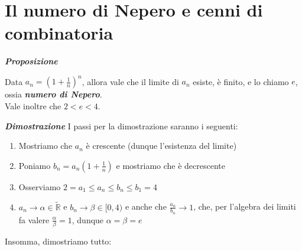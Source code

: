 \documentclass{article}
\theoremstyle{definition}
\newcommand{\R}{\mathbb{R}}
\begin{document}
\section{Il numero di Nepero e cenni di combinatoria}
\begin{center}
    \textbf{\textit{Proposizione}}
\end{center}
Data $a_n=(1+\frac{1}{n})^n$, allora vale che il limite di $a_n$ esiste, è finito, e lo chiamo $e$, ossia \textbf{\textit{numero di Nepero}}.
\\
Vale inoltre che $2<e<4$.
\\
\begin{center}
    \textbf{\textit{Dimostrazione}}
    I passi per la dimostrazione saranno i seguenti:
\end{center}
\begin{enumerate}
    \item Mostriamo che $a_n$ è crescente (dunque l'esistenza del limite)
    \item Poniamo $b_n=a_n\left(1+\frac{1}{n}\right)$ e mostriamo che è decrescente
    \item Osserviamo $2=a_1 \leqslant a_n \leqslant b_n \leqslant b_1 = 4$
    \item $a_n \to \alpha \in \tilde{\R}$ e $b_n \to \beta \in [0,4)$ e anche che $\frac{a_n}{b_n} \to 1$, che, per l'algebra dei limiti fa valere $\frac{\alpha}{\beta}=1$, dunque $\alpha=\beta=e$
\end{enumerate}
Insomma, dimostriamo tutto:
\end{document}

